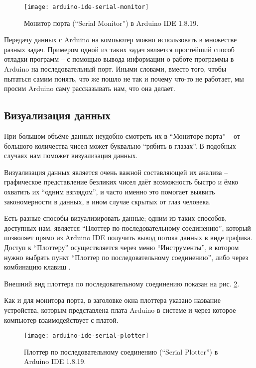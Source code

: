 \documentclass[../sparc.tex]{subfiles}
\begin{document}
\begin{figure}[ht]
  \centering
  \texttt{[image: arduino-ide-serial-monitor]}
  \caption{Монитор порта (``Serial Monitor'') в Arduino IDE 1.8.19.}
  \label{fig:arduino-ide-serial-monitor}
\end{figure}

Передачу данных с Arduino на компьютер можно использовать в множестве разных
задач. Примером одной из таких задач является простейший способ отладки программ
-- с помощью вывода информации о работе программы в Arduino на последовательный
порт. Иными словами, вместо того, чтобы пытаться самим понять, что же пошло не
так и почему что-то не работает, мы просим Arduino саму рассказывать нам, что
она делает.

\subsection{Визуализация данных}

При большом объёме данных неудобно смотреть их в ``Мониторе порта'' -- от
большого количества чисел может буквально ``рябить в глазах''.  В подобных
случаях нам поможет визуализация данных.

Визуализация данных является очень важной составляющей их анализа -- графическое
представление безликих чисел даёт возможность быстро и ёмко охватить их ``одним
взглядом'', и часто именно это помогает выявить закономерности в данных, в ином
случае скрытых от глаз человека.

Есть разные способы визуализировать данные; одним из таких способов, доступных
нам, является ``Плоттер по последовательному соединению'', который позволяет
прямо из Arduino IDE получить вывод потока данных в виде графика.  Доступ к
``Плоттеру'' осуществляется через меню ``Инструменты'', в котором нужно выбрать
пункт ``Плоттер по последовательному соединению'', либо через комбинацию клавиш
.

Внешний вид плоттера по последовательному соединению показан на
рис. \ref{fig:arduino-ide-serial-plotter}.

Как и для монитора порта, в заголовке окна плоттера указано название устройства,
которым представлена плата Arduino в системе и через которое компьютер
взаимодействует с платой.

\begin{figure}[ht]
  \centering
  \texttt{[image: arduino-ide-serial-plotter]}
  \caption{Плоттер по последовательному соединению (``Serial Plotter'') в
    Arduino IDE 1.8.19.}
  \label{fig:arduino-ide-serial-plotter}
\end{figure}
\end{document}
